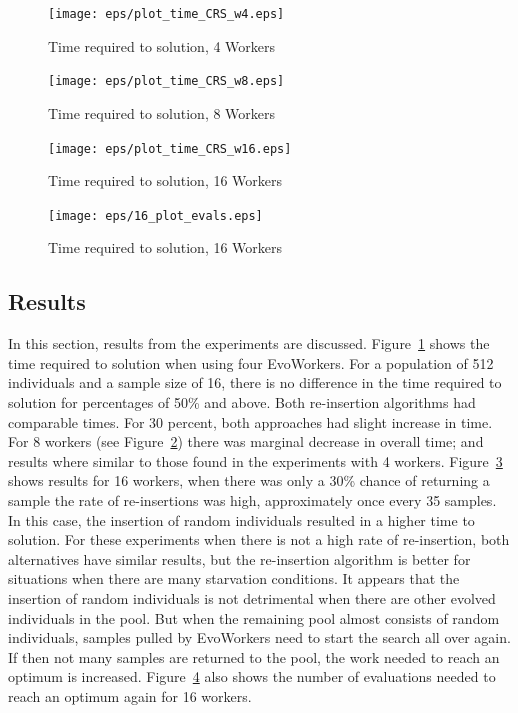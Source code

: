 \documentclass{llncs}
\begin{document}
\begin{figure}[t]
\centering
\texttt{[image: eps/plot\_time\_CRS\_w4.eps]}
\caption{Time required to solution, 4 Workers}
\label{fig:plot_time_ri_w4}
\end{figure}


\begin{figure}[!t]
\centering
\texttt{[image: eps/plot\_time\_CRS\_w8.eps]}
\caption{Time required to solution, 8 Workers}
\label{fig:plot_time_ri_w8}
\end{figure}


\begin{figure}[!t]
\centering
\texttt{[image: eps/plot\_time\_CRS\_w16.eps]}
\caption{Time required to solution, 16 Workers}
\label{fig:plot_time_ri_w16}
\end{figure}


\begin{figure}[t]
\centering
\texttt{[image: eps/16\_plot\_evals.eps]}
\caption{Time required to solution, 16 Workers}
\label{fig:plot_evals_w16}
\end{figure}


\subsection{Results}
In this section, results from the experiments are discussed. 
Figure~\ref{fig:plot_time_ri_w4} shows the time required 
to solution when using four EvoWorkers. For a population of
512 individuals and a sample size of 16, there is no
difference in the time required to solution for 
percentages of 50\% and above. Both re-insertion algorithms
had comparable times. For 30 percent, both approaches 
had slight increase in time. For 8 workers 
(see Figure~\ref{fig:plot_time_ri_w8})  there was marginal
decrease in overall time; and results where 
similar to those found in the experiments with 4 workers.  
Figure~\ref{fig:plot_time_ri_w16} shows results for 16 workers,
when there was only a 30\% chance of returning a sample 
the rate of re-insertions was high, approximately once every 35
samples. In this case, the insertion of random individuals 
resulted in a higher time to solution. For these experiments
when there is not a high rate of re-insertion, both alternatives
have similar results, but the re-insertion algorithm is better
for situations when there are many starvation conditions. It appears
that the insertion of random individuals is not detrimental when there
are other evolved individuals in the pool. But when the remaining
pool almost consists of random individuals, samples pulled by
EvoWorkers need to start the search all over again. If then not many
samples are returned to the pool, the work needed to reach an
optimum is increased. Figure~\ref{fig:plot_evals_w16} also shows the number 
of evaluations needed to reach an optimum again for 16 workers.
\end{document}
